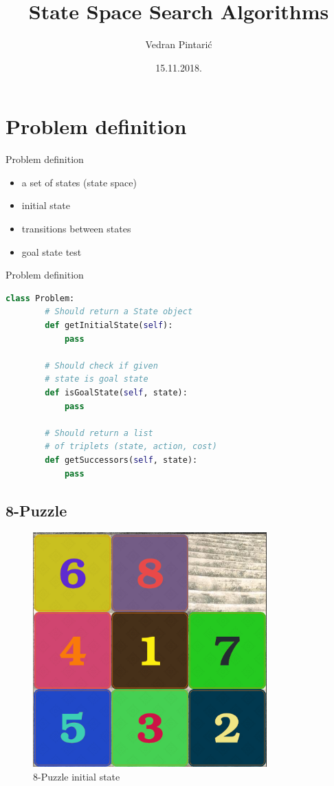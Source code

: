 \documentclass{beamer}
\title[State Space Search Algorithms]{State Space Search Algorithms}
\author{Vedran Pintarić}
\date{15.11.2018.}
\begin{document}
\begin{frame}
  \titlepage
\end{frame}

\section{Problem definition}

\begin{frame}{Problem definition}

	\begin{itemize}
		\item a set of states (state space)
		\item initial state
		\item transitions between states
		\item goal state test
	\end{itemize}

\end{frame}

\begin{frame}[fragile]{Problem definition}

	\begin{lstlisting}[language=Python]
	class Problem:
		# Should return a State object
		def getInitialState(self):
			pass
	
		# Should check if given
		# state is goal state
		def isGoalState(self, state):
			pass
	
		# Should return a list
		# of triplets (state, action, cost)
		def getSuccessors(self, state):
			pass
	\end{lstlisting}

\end{frame}

\subsection{8-Puzzle}

\begin{frame}
	\begin{figure}
	\centering
		\includegraphics[width=0.5\linewidth]{puzzle8.png}
		\caption{8-Puzzle initial state}
	\end{figure}
\end{frame}
\end{document}
